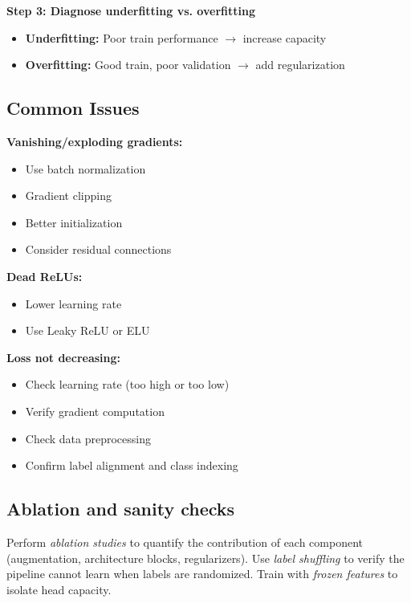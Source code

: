 \textbf{Step 3: Diagnose underfitting vs. overfitting}
\begin{itemize}
    \item \textbf{Underfitting:} Poor train performance $\to$ increase capacity
    \item \textbf{Overfitting:} Good train, poor validation $\to$ add regularization
\end{itemize}

\subsection{Common Issues}

\textbf{Vanishing/exploding gradients:}
\begin{itemize}
    \item Use batch normalization
    \item Gradient clipping
    \item Better initialization
    \item Consider residual connections
\end{itemize}

\textbf{Dead ReLUs:}
\begin{itemize}
    \item Lower learning rate
    \item Use Leaky ReLU or ELU
\end{itemize}

\textbf{Loss not decreasing:}
\begin{itemize}
    \item Check learning rate (too high or too low)
    \item Verify gradient computation
    \item Check data preprocessing
    \item Confirm label alignment and class indexing
\end{itemize}

\subsection{Ablation and sanity checks}

Perform \emph{ablation studies}  to quantify the contribution of each component (augmentation, architecture blocks, regularizers). Use \emph{label shuffling} to verify the pipeline cannot learn when labels are randomized. Train with \emph{frozen features} to isolate head capacity.


